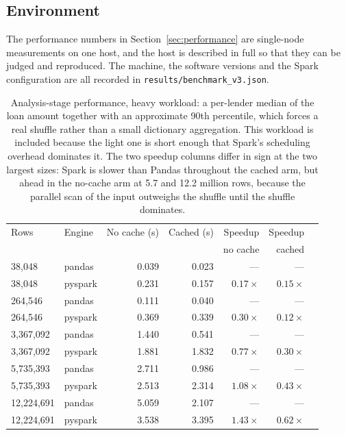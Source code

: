 \documentclass[sigconf,balance=false]{acmart}
\begin{document}
\subsection{Environment}

The performance numbers in Section~\ref{sec:performance} are single-node
measurements on one host, and the host is described in full so that they
can be judged and reproduced. The machine, the software versions and the
Spark configuration are all recorded in
\texttt{results/benchmark\_\allowbreak v3.json}.

\begin{table}[t]
\caption{Analysis-stage performance, heavy workload: a per-lender median of
         the loan amount together with an approximate 90th percentile, which
         forces a real shuffle rather than a small dictionary aggregation.
         This workload is included because the light one is short enough
         that Spark's scheduling overhead dominates it. The two speedup
         columns differ in sign at the two largest sizes: Spark is slower
         than Pandas throughout the cached arm, but ahead in the no-cache
         arm at 5.7 and 12.2 million rows, because the parallel scan of
         the input outweighs the shuffle until the shuffle dominates.}
\label{tab:benchheavy}
\centering
\footnotesize
\begin{tabular}{@{}llrrrrr@{}}
\toprule
Rows & Engine & No cache (s) & Cached (s) & Speedup & Speedup \\
     &        &             &            & no cache & cached \\
\midrule
38{,}048     & pandas  & 0.039 & 0.023 & ---   & --- \\
38{,}048     & pyspark & 0.231 & 0.157 & $0.17\times$ & $0.15\times$ \\
\midrule
264{,}546    & pandas  & 0.111 & 0.040 & ---   & --- \\
264{,}546    & pyspark & 0.369 & 0.339 & $0.30\times$ & $0.12\times$ \\
\midrule
3{,}367{,}092 & pandas  & 1.440 & 0.541 & ---   & --- \\
3{,}367{,}092 & pyspark & 1.881 & 1.832 & $0.77\times$ & $0.30\times$ \\
\midrule
5{,}735{,}393 & pandas  & 2.711 & 0.986 & ---   & --- \\
5{,}735{,}393 & pyspark & 2.513 & 2.314 & $1.08\times$ & $0.43\times$ \\
\midrule
12{,}224{,}691 & pandas  & 5.059 & 2.107 & ---   & --- \\
12{,}224{,}691 & pyspark & 3.538 & 3.395 & $1.43\times$ & $0.62\times$ \\
\bottomrule
\end{tabular}
\end{table}
\end{document}
